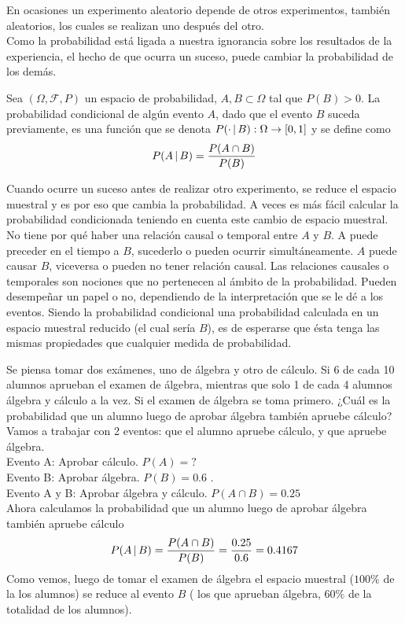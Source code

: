 En ocasiones un experimento aleatorio depende de otros experimentos, también aleatorios, los cuales se realizan uno después del otro.\\
Como la probabilidad está ligada a nuestra ignorancia sobre los resultados de la experiencia, el hecho de que ocurra un suceso, puede cambiar la probabilidad de los demás.
\begin{Def}
    Sea $(\Omega,\mathscr{F},P)$ un espacio de probabilidad, $A,B\subset\Omega$ tal que $P(B)>0$. La probabilidad condicional de algún evento $A$, dado que el evento $B$ suceda previamente, es una función que se denota $P(\cdot\thinspace|\thinspace B):\Omega\rightarrow [0,1]$ y se define como $$P(A\thinspace|\thinspace B)=\frac{P(A\cap B)}{P(B)}$$
\end{Def}
Cuando ocurre un suceso antes de realizar otro experimento, se reduce el espacio muestral y es por eso que cambia la probabilidad. A veces es más fácil calcular la probabilidad condicionada teniendo en cuenta este cambio de espacio muestral.
No tiene por qué haber una relación causal o temporal entre $A$ y $B$. A puede preceder en el tiempo a $B$, sucederlo o pueden ocurrir simultáneamente. $A$ puede causar $B$, viceversa o pueden no tener relación causal. Las relaciones causales o temporales son nociones que no pertenecen al ámbito de la probabilidad. Pueden desempeñar un papel o no, dependiendo de la interpretación que se le dé a los eventos.
Siendo la probabilidad condicional una probabilidad calculada en un espacio muestral reducido (el cual sería $B$), es de esperarse que ésta tenga las mismas propiedades que cualquier medida de probabilidad.
\begin{Ejm}
Se piensa tomar dos exámenes, uno de álgebra y otro de cálculo.
Si 6 de cada 10 alumnos aprueban el examen de álgebra, mientras que solo 1 de cada 4 alumnos  álgebra y cálculo a la vez. Si el examen de álgebra se toma primero. ¿Cuál es la probabilidad que un alumno luego de aprobar álgebra también apruebe cálculo?
    Vamos a trabajar con 2 eventos: que el alumno apruebe cálculo, y que apruebe álgebra.\\
    Evento A: Aprobar cálculo. $P(A) = ?$\\
    Evento B: Aprobar álgebra. $P(B) =0.6$ .\\
    Evento A y B: Aprobar álgebra y cálculo. $P(A\cap B) =0.25$\\
    Ahora calculamos la probabilidad que un alumno luego de aprobar álgebra también apruebe cálculo
    $$P(A\thinspace|\thinspace B)=\frac{P(A\cap B)}{P(B)}=\frac{0.25}{0.6}=0.4167$$
  Como vemos, luego de tomar el examen de álgebra el espacio muestral ($100\%$ de la los alumnos) se reduce al evento $B$ ( los que aprueban álgebra, $60 \%$ de la totalidad de los alumnos).
  \end{Ejm}
